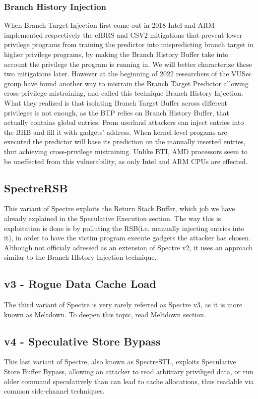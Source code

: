 \subsubsection{Branch History Injection}
When Branch Target Injection first come out in 2018 Intel and ARM implemented respectively the eIBRS and CSV2 mitigations that prevent lower privilege programs from training the predictor into mispredicting branch target in higher privilege programs, by making the Branch History Buffer take into account the privilege the program is running in. 
We will better characterize these two mitigations later.
However at the beginning of 2022 researchers of the VUSec group have found another way to mistrain the Branch Target Predictor allowing cross-privilege mistraining, and called this technique Branch History Injection.
What they realized is that isolating Branch Target Buffer across different privileges is not enough, as the BTP relies on Branch History Buffer, that actually contains global entries.
From userland attackers can inject entries into the BHB and fill it with gadgets' address. When kernel-level progams are executed the predictor will base its prediction on the manually inserted entries, thut achieving cross-privilege mistraining.
Unlike BTI, AMD processors seem to be uneffected from this vulnerability, as only Intel and ARM CPUs are effected.

\subsection{SpectreRSB}
This variant of Spectre exploits the Return Stack Buffer, which job we have already explained in the Speculative Execution section.
The way this is exploitation is done is by polluting the RSB(i.e. manually injecting entries into it), in order to have the victim program execute gadgets the attacker has chosen.
Although not officialy adressed as an extension of Spectre v2, it uses an approach similar to the Branch HIstory Injection technique.

\subsection{v3 - Rogue Data Cache Load}
The third variant of Spectre is very rarely referred as Spectre v3, as it is more known as Meltdown. To deepen this topic, read Meltdown section.

\subsection{v4 - Speculative Store Bypass}
This last variant of Spectre, also known as SpectreSTL, exploits Speculative Store Buffer Bypass, allowing an attacker to read arbitrary priviliged data, or run older command speculatively than can lead to cache allocations, thus readable via common side-channel techniques.

